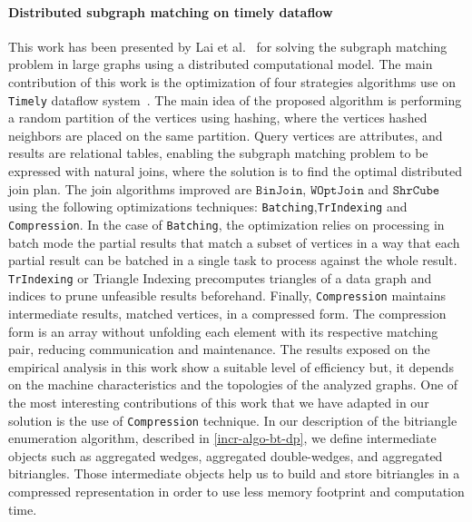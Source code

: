 \paragraph{Distributed subgraph matching on timely dataflow} This work has been presented by Lai et al.~\cite{Lai} for solving the subgraph matching problem in large graphs using a distributed computational model.
The main contribution of this work is the optimization of four strategies algorithms use on \texttt{Timely} dataflow system~\cite{timelyflow}. 
The main idea of the proposed algorithm is performing a random partition of the vertices using hashing, where the vertices hashed neighbors are placed on the same partition.
Query vertices are attributes, and results are relational tables, enabling the subgraph matching problem to be expressed with natural joins, where the solution is to find the optimal distributed join plan.
The join algorithms improved are $\mathtt{BinJoin}$, $\mathtt{WOptJoin}$ and $\mathtt{ShrCube}$ using the following optimizations techniques: \texttt{Batching},\texttt{TrIndexing} and \texttt{Compression}.
In the case of \texttt{Batching}, the optimization relies on processing in batch mode the partial results that match a subset of vertices in a way that each partial result can be batched in a single task to process against the whole result.
\texttt{TrIndexing} or Triangle Indexing precomputes triangles of a data graph and indices to prune unfeasible results beforehand. 
Finally, \texttt{Compression} maintains intermediate results, matched vertices, in a compressed form. The compression form is an array without unfolding each element with its respective matching pair, reducing communication and maintenance.
The results exposed on the empirical analysis in this work show a suitable level of efficiency but, it depends on the machine characteristics and the topologies of the analyzed graphs. 
One of the most interesting contributions of this work that we have adapted in our solution is the use of \texttt{Compression} technique. 
In our description of the bitriangle enumeration algorithm, described in \autoref{incr-algo-bt-dp}, we define intermediate objects such as aggregated wedges, aggregated double-wedges, and aggregated bitriangles. 
Those intermediate objects help us to build and store bitriangles in a compressed representation in order to use less memory footprint and computation time.

